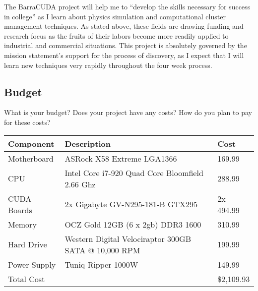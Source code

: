 \documentclass[10pt]{article}
\begin{document}
The BarraCUDA project will help me to ``develop the skills necessary for success in college'' as I learn about physics simulation and computational cluster management techniques.  As stated above, these fields are drawing funding and research focus as the fruits of their labors become more readily applied to industrial and commercial situations. This project is absolutely governed by the mission statement's support for the process of discovery, as I expect that I will learn new techniques very rapidly throughout the four week process. 

\subsection{Budget}
What is your budget? Does your project have any costs? How do you plan to pay for these costs?

\begin{table}[h]
	\centering
		\begin{tabular}{|l|l|l|}
		\hline
			Component & Description & Cost\\ \hline
			Motherboard & ASRock X58 Extreme LGA1366 & 169.99\\ \hline
			CPU & Intel Core i7-920 Quad Core Bloomfield 2.66 Ghz & 288.99\\ \hline
			CUDA Boards & 2x Gigabyte GV-N295-181-B  GTX295 & 2x 494.99\\ \hline
			Memory & OCZ Gold 12GB (6 x 2gb) DDR3 1600 & 310.99\\ \hline
			Hard Drive & Western Digital Velociraptor 300GB SATA @ 10,000 RPM & 199.99\\ \hline
			Power Supply & Tuniq Ripper 1000W & 149.99\\ \hline
			Total Cost &  & \$2,109.93\\ 
		\hline
		\end{tabular}
\end{table}
\end{document}
